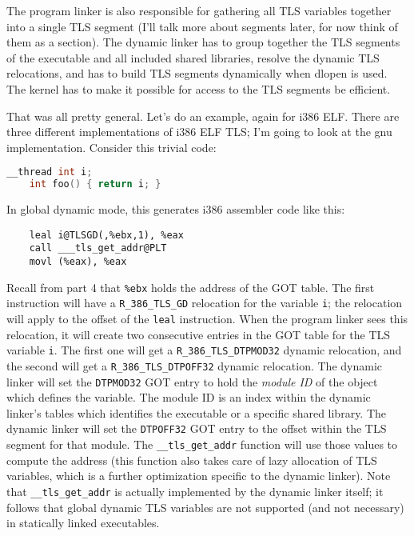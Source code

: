 The program linker is also responsible for gathering all TLS variables together
into a single TLS segment (I'll talk more about segments later, for now think
of them as a section). The dynamic linker has to group together the TLS
segments of the executable and all included shared libraries, resolve the
dynamic TLS relocations, and has to build TLS segments dynamically when dlopen
is used. The kernel has to make it possible for access to the TLS segments be
efficient.

That was all pretty general. Let's do an example, again for i386 ELF\@. There
are three different implementations of i386 ELF TLS; I'm going to look at the
gnu implementation. Consider this trivial code:

\begin{lstlisting}[language=C]
    __thread int i;
    int foo() { return i; }
\end{lstlisting}

In global dynamic mode, this generates i386 assembler code like this:


\begin{lstlisting}
    leal i@TLSGD(,%ebx,1), %eax
    call ___tls_get_addr@PLT
    movl (%eax), %eax
\end{lstlisting}

Recall from part 4 that \texttt{\%ebx} holds the address of the GOT table.
The first instruction will have a \texttt{R\_386\_TLS\_GD} relocation for
the variable \texttt{i}; the relocation will apply to the offset of the
\texttt{leal} instruction. When the program linker sees this relocation, it
will create two consecutive entries in the GOT table for the TLS variable
\texttt{i}. The first one will get a \texttt{R\_386\_TLS\_DTPMOD32} dynamic
relocation, and the second will get a \texttt{R\_386\_TLS\_DTPOFF32} dynamic
relocation. The dynamic linker will set the \texttt{DTPMOD32} GOT entry to
hold the \emph{module ID} of the object which defines the variable. The
module ID is an index within the dynamic linker's tables which identifies
the executable or a specific shared library. The dynamic linker will set the
\texttt{DTPOFF32} GOT entry to the offset within the TLS segment for that
module. The \texttt{\_\_tls\_get\_addr} function will use those values to
compute the address (this function also takes care of lazy allocation of TLS
variables, which is a further optimization specific to the dynamic linker).
Note that \texttt{\_\_tls\_get\_addr} is actually implemented by the dynamic
linker itself; it follows that global dynamic TLS variables are not supported
(and not necessary) in statically linked executables.

